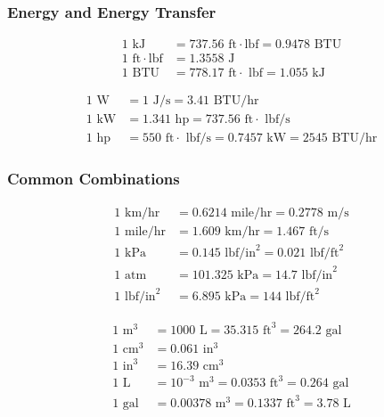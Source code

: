 \begin{multicols}{2}
\subsubsection{Energy and Energy Transfer}
\begin{align*}
1 \text{ kJ} & =  737.56 \text{ ft}\cdot \text{lbf} = 0.9478 \text{ BTU} \\
1 \text{ ft}\cdot \text{lbf} & = 1.3558 \text{ J} \\
1 \text{ BTU} & = 778.17 \text{ ft}\cdot \text{ lbf} = 1.055 \text{ kJ}
\end{align*}

\begin{align*}
1 \text{ W} & = 1 \text{ J/s} = 3.41 \text{ BTU/hr}\\
1 \text{ kW} &= 1.341 \text{ hp} = 737.56 \text{ ft}\cdot \text{ lbf/s}\\
1 \text{ hp} &= 550 \text{ ft}\cdot \text{ lbf/s} = 0.7457 \text{ kW} = 2545 \text{ BTU/hr}
\end{align*}

\end{multicols}

\begin{multicols}{2}
\subsubsection{Common Combinations}
\begin{align*}
1 \text{ km/hr} & =  0.6214 \text{ mile/hr} = 0.2778 \text{ m/s} \\
1 \text{ mile/hr} & =  1.609 \text{ km/hr} = 1.467 \text{ ft/s} \\
1 \text{ kPa} & = 0.145 \text{ lbf/in}^2 = 0.021 \text{ lbf/ft}^2 \\
1 \text{ atm} & = 101.325 \text{ kPa} = 14.7 \text{ lbf/in}^2 \\
1 \text{ lbf/in}^2 &= 6.895 \text{ kPa} = 144 \text{ lbf/ft}^2
\end{align*}

\begin{align*}
1 \text{ m}^3 &= 1000 \text{ L} = 35.315 \text{ ft}^3 = 264.2 \text{ gal}\\
1 \text{ cm}^3 &= 0.061 \text{ in}^3 \\
1 \text{ in}^3 &= 16.39 \text{ cm}^3 \\
1 \text{ L} &= 10^{-3} \text{ m}^3 = 0.0353 \text{ ft}^3 = 0.264 \text{ gal} \\
1 \text{ gal} &= 0.00378 \text{ m}^3 = 0.1337 \text{ ft}^3 = 3.78 \text{ L}
\end{align*}

\end{multicols}

